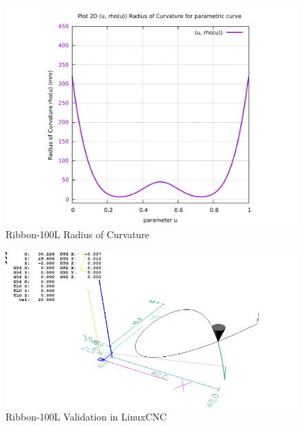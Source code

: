 \begin{figure}
	\caption     {Ribbon-100L Radius of Curvature}
	\label{02-img-Ribbon-100L Radius of Curvature.pdf}
	\includegraphics[width=1.00\textwidth]{Chap4/appendix/app-Ribbon-100L/plots/02-img-Ribbon-100L Radius of Curvature.pdf} 
\end{figure}	


\clearpage
\pagebreak

\begin{figure}
	\caption     {Ribbon-100L Validation in LinuxCNC}
	\label{03-img-Ribbon-100L-Validation-in-LinuxCNC.png}
	\includegraphics[width=1.00\textwidth]{Chap4/appendix/app-Ribbon-100L/plots/03-img-Ribbon-100L-Validation-in-LinuxCNC.png}
\end{figure}


